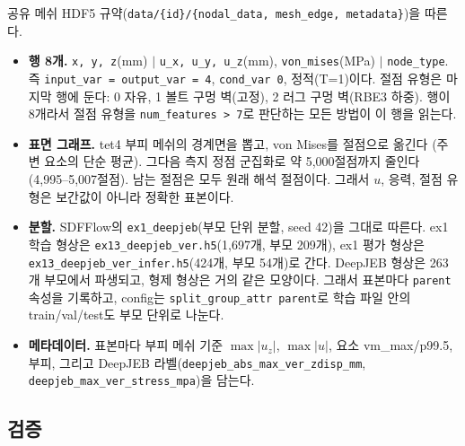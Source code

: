 \documentclass[11pt]{article}
\newcommand{\NTRAIN}{1,697}
\newcommand{\NINFER}{424}
\newcommand{\PTRAIN}{209}
\newcommand{\PINFER}{54}
\newcommand{\NODESMIN}{4,995}
\newcommand{\NODESMAX}{5,007}
\begin{document}
공유 메쉬 HDF5 규약(\texttt{data/\{id\}/\{nodal\_data, mesh\_edge, metadata\}})을 따른다.
\begin{itemize}
\item \textbf{행 8개.} \texttt{x, y, z}(mm) $|$ \texttt{u\_x, u\_y, u\_z}(mm),
      \texttt{von\_mises}(MPa) $|$ \texttt{node\_type}. 즉 \texttt{input\_var = output\_var = 4},
      \texttt{cond\_var 0}, 정적(T=1)이다. 절점 유형은 마지막 행에 둔다: 0 자유,
      1 볼트 구멍 벽(고정), 2 러그 구멍 벽(RBE3 하중).
      행이 8개라서 절점 유형을 \texttt{num\_features > 7}로 판단하는 모든 방법이 이 행을 읽는다.
\item \textbf{표면 그래프.} tet4 부피 메쉬의 경계면을 뽑고, von Mises를 절점으로 옮긴다
      (주변 요소의 단순 평균). 그다음 측지 정점 군집화로 약 5,000절점까지 줄인다
      (\NODESMIN--\NODESMAX 절점). 남는 절점은 모두 원래 해석 절점이다. 그래서 $u$, 응력,
      절점 유형은 보간값이 아니라 정확한 표본이다.
\item \textbf{분할.} SDFFlow의 \texttt{ex1\_deepjeb}(부모 단위 분할, seed 42)을 그대로 따른다.
      ex1 학습 형상은 \texttt{ex13\_deepjeb\_ver.h5}(\NTRAIN{}개, 부모 \PTRAIN{}개),
      ex1 평가 형상은 \texttt{ex13\_deepjeb\_ver\_infer.h5}(\NINFER{}개, 부모 \PINFER{}개)로 간다.
      DeepJEB 형상은 263개 부모에서 파생되고, 형제 형상은 거의 같은 모양이다. 그래서
      표본마다 \texttt{parent} 속성을 기록하고, config는 \texttt{split\_group\_attr parent}로
      학습 파일 안의 train/val/test도 부모 단위로 나눈다.
\item \textbf{메타데이터.} 표본마다 부피 메쉬 기준 $\max|u_z|$, $\max|u|$, 요소 vm\_max/p99.5,
      부피, 그리고 DeepJEB 라벨(\texttt{deepjeb\_abs\_max\_ver\_zdisp\_mm},
      \texttt{deepjeb\_max\_ver\_stress\_mpa})을 담는다.
\end{itemize}

\subsection{검증}
\end{document}
